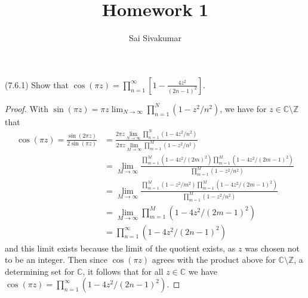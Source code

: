 \documentclass[12pt]{amsart}
\title{Homework 1}
\author{Sai Sivakumar}
\begin{document}
\maketitle

\thispagestyle{empty}
(7.6.1) Show that $\displaystyle \cos(\pi z) = \prod_{n=1}^\infty\left[1-\frac{4z^2}{(2n-1)^2}\right]$. \begin{proof}
    With $\sin(\pi z) = \pi z \lim_{N\to \infty}\prod_{n=1}^N \left(1-z^2/n^2\right)$, we have for $z\in \mathbb{C}\setminus\mathbb{Z}$ that \begin{align*}
        \cos(\pi z) = \frac{\sin(2\pi z)}{2\sin(\pi z)} &= \frac{2\pi z \lim_{N\to \infty}\prod_{n=1}^N \left(1-4z^2/n^2\right)}{2\pi z \lim_{M\to \infty}\prod_{m=1}^M \left(1-z^2/n^2\right)}\\
        &= \lim_{M\to \infty}\frac{\prod_{m=1}^M \left(1-4z^2/(2m)^2\right)\prod_{m=1}^M \left(1-4z^2/(2m-1)^2\right)}{\prod_{m=1}^M \left(1-z^2/n^2\right)}\\
        &= \lim_{M\to \infty}\frac{\prod_{m=1}^M \left(1-z^2/m^2\right)\prod_{m=1}^M \left(1-4z^2/(2m-1)^2\right)}{\prod_{m=1}^M \left(1-z^2/n^2\right)}\\
        &= \lim_{M\to \infty} \prod_{m=1}^M \left(1-4z^2/(2m-1)^2\right)\\
        &= \prod_{n=1}^\infty \left(1-4z^2/(2n-1)^2\right)
    \end{align*} and this limit exists because the limit of the quotient exists, as $z$ was chosen not to be an integer. Then since $\cos(\pi z)$ agrees with the product above for $\mathbb{C}\setminus \mathbb{Z}$, a determining set for $\mathbb{C}$, it follows that for all $z\in\mathbb{C}$ we have $\cos(\pi z) =\prod_{n=1}^\infty \left(1-4z^2/(2n-1)^2\right)$.
\end{proof}
\end{document}
